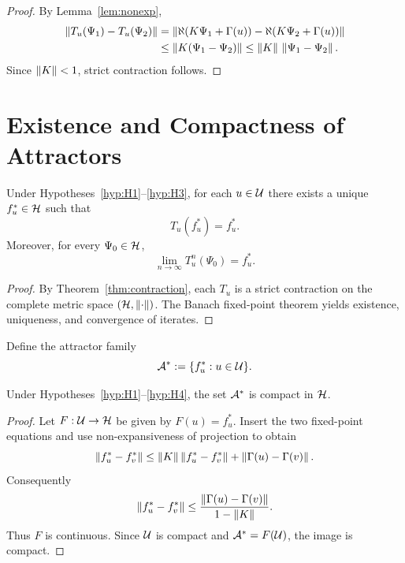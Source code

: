 \begin{proof}
By Lemma~\ref{lem:nonexp},
\begin{align*}
\left\lVert T_u(\Psi_1)-T_u(\Psi_2) \right\rVert
&=
\left\lVert \aleph(K\Psi_1+\Gamma(u))-\aleph(K\Psi_2+\Gamma(u)) \right\rVert \\
&\le \left\lVert K(\Psi_1-\Psi_2) \right\rVert
\le \left\lVert K \right\rVert\,\left\lVert \Psi_1-\Psi_2 \right\rVert.
\end{align*}
Since $\left\lVert K \right\rVert<1$, strict contraction follows.
\end{proof}

\section{Existence and Compactness of Attractors}

\begin{theorem}\label{thm:fixedpoint}
Under Hypotheses~\ref{hyp:H1}--\ref{hyp:H3}, for each $u\in\mathcal{U}$ there exists a unique $f_u^\ast\in\mathcal{H}$ such that
\[
T_u(f_u^\ast)=f_u^\ast.
\]
Moreover, for every $\Psi_0\in\mathcal{H}$,
\[
\lim_{n\to\infty}T_u^n(\Psi_0)=f_u^\ast.
\]
\end{theorem}

\begin{proof}
By Theorem~\ref{thm:contraction}, each $T_u$ is a strict contraction on the complete metric space $(\mathcal{H},\left\lVert \cdot \right\rVert)$. The Banach fixed-point theorem yields existence, uniqueness, and convergence of iterates.
\end{proof}

\begin{definition}\label{def:attractor}
Define the attractor family
\[
\mathcal{A}^\ast:=\{f_u^\ast:u\in\mathcal{U}\}.
\]
\end{definition}

\begin{theorem}\label{thm:compactness}
Under Hypotheses~\ref{hyp:H1}--\ref{hyp:H4}, the set $\mathcal{A}^\ast$ is compact in $\mathcal{H}$.
\end{theorem}

\begin{proof}
Let $F:\mathcal{U}\to\mathcal{H}$ be given by $F(u)=f_u^\ast$. Insert the two fixed-point equations and use non-expansiveness of projection to obtain
\[
\left\lVert f_u^\ast-f_v^\ast \right\rVert
\leq\left\lVert K \right\rVert\left\lVert f_u^\ast-f_v^\ast \right\rVert+\left\lVert \Gamma(u)-\Gamma(v) \right\rVert.
\]
Consequently
\[
\left\lVert f_u^\ast-f_v^\ast \right\rVert
\leq\frac{\left\lVert \Gamma(u)-\Gamma(v) \right\rVert}{1-\left\lVert K \right\rVert}.
\]
Thus $F$ is continuous. Since $\mathcal{U}$ is compact and $\mathcal{A}^\ast=F(\mathcal{U})$, the image is compact.
\end{proof}

